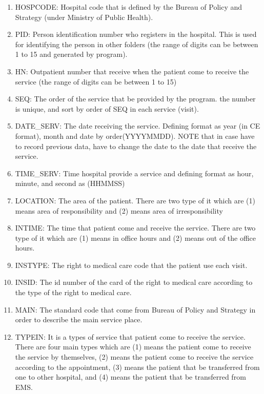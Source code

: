 \begin{enumerate}
  \item HOSPCODE: Hospital code that is defined by the Bureau of Policy and Strategy (under Ministry of Public Health). 
  \item PID: Person identification number who registers in the hospital. This is used for identifying the person in other folders (the range of digits can be between 1 to 15 and generated by program).
  \item HN: Outpatient number that receive when the patient come to receive the service (the range of digits can be between 1 to 15)
  \item SEQ: The order of the service that be provided by the program. the number is unique, and sort by order of SEQ in each service (visit).
  \item DATE\_SERV: The date receiving the service. Defining format as year (in CE format), month and date  by order(YYYYMMDD). NOTE that in case have to record previous data, have to change the date to the date that receive the service.
  \item TIME\_SERV: Time hospital provide a service and defining format as  hour, minute, and second as (HHMMSS)  
  \item LOCATION: The area of the patient. There are two type of it which are (1) means area of responsibility and (2) means area of irresponsibility
  \item INTIME: The time that patient come and receive the service. There are two type of it which are (1) means in office hours and (2) means out of the office hours.
  \item INSTYPE: The right to medical care code that the patient use each visit.
  \item INSID: The id number of the card of the right to medical care according to the type of the right to medical care.
  \item MAIN: The standard code that come from Bureau of Policy and Strategy in order to describe the main service place.
  \item TYPEIN: It is a types of service that patient come to receive the service. There are four main types which are (1) means the patient come to receive the service by themselves, (2) means the patient come to receive the service according to the appointment, (3) means the patient that be transferred from one to other hospital, and (4) means the patient that be transferred from EMS.

\end{enumerate}
